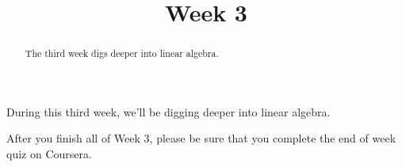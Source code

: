 \documentclass{ximera}
\title{Week 3}
\begin{document}
\begin{abstract}
  The third week digs deeper into linear algebra.
\end{abstract}\maketitle

During this third week, we'll be digging deeper into linear algebra.

After you finish all of Week 3, please be sure that you complete the
end of week quiz on Coursera.
\end{document}
